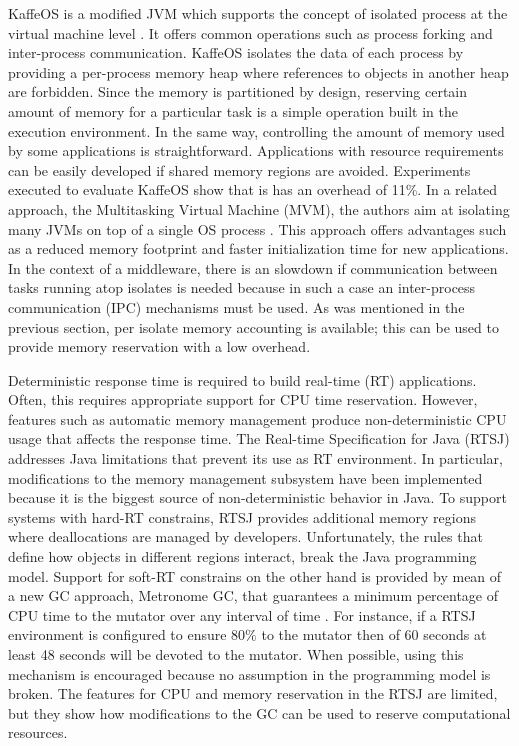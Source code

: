 KaffeOS is a modified JVM which supports the concept of isolated process at the virtual machine level \cite{back_processes_2000, Back:2005:KJR:1075382.1075383}.
It offers common operations such as process forking and inter-process communication.
KaffeOS isolates the data of each process by providing a per-process memory heap where references to objects in another heap are forbidden.
Since the memory is partitioned by design, reserving certain amount of memory for a particular task is a simple operation built in the execution environment.
In the same way, controlling the amount of memory used by some applications is straightforward.
Applications with resource requirements can be easily developed if shared memory regions are avoided.
Experiments executed to evaluate KaffeOS show that is has an overhead of 11\%.
In a related approach, the Multitasking Virtual Machine (MVM), the authors aim at isolating many JVMs on top of
a single OS process \cite{czajkowski_multitasking_2001}.
This approach offers advantages such as a reduced memory footprint and faster initialization time for new applications.
In the context of a middleware, there is an slowdown if communication between tasks running atop isolates is needed because in such a case an inter-process communication (IPC) mechanisms must be used.
As was mentioned in the previous section, per isolate memory accounting is available;
this can be used to provide memory reservation with a low overhead. 

Deterministic response time is required to build real-time (RT) applications.
Often, this requires appropriate support for CPU time reservation. 
However, features such as automatic memory management produce non-deterministic CPU usage that affects the response time.
The Real-time Specification for Java (RTSJ) addresses Java limitations that prevent its use as RT environment.
In particular, modifications to the memory management subsystem have been implemented because it is the biggest source of non-deterministic behavior in Java.
To support systems with hard-RT constrains, RTSJ provides additional memory regions where deallocations are managed by developers.
Unfortunately, the rules that define how objects in different regions interact, break the Java programming model.
Support for soft-RT constrains on the other hand is provided by mean of a new GC approach, Metronome GC,  that guarantees a minimum percentage of CPU time to the mutator over any interval of time \cite{Bacon03themetronome:}.
For instance, if a RTSJ environment is configured to ensure 80$\%$ to the mutator then of 60 seconds at least 48 seconds will be devoted to the mutator.
When possible, using this mechanism is encouraged because no assumption in the programming model is broken.
The features for CPU and memory reservation in the RTSJ are limited, but they show how modifications to the GC can be used to reserve computational resources. 


